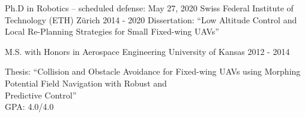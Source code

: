 

\begin{cventries}

  \cventry
    {Ph.D in Robotics -- scheduled defense: May 27, 2020} %
    {Swiss Federal Institute of Technology (ETH) Z\"{u}rich} %
    {} %
    {2014 - 2020} %
    {Dissertation: ``Low Altitude Control and Local Re-Planning Strategies for Small Fixed-wing UAVs''}
    
  \cventry
    {M.S. with Honors in Aerospace Engineering} %
    {University of Kansas} %
    {} %
    {2012 - 2014} %
    {\parbox{\linewidth}{\vspace*{0.1cm}
		Thesis: ``Collision and Obstacle Avoidance for Fixed-wing UAVs using Morphing Potential Field Navigation with Robust and \\	
		\hspace*{1cm} Predictive Control''\\
        GPA: 4.0/4.0
        }
    }
    

\end{cventries}
